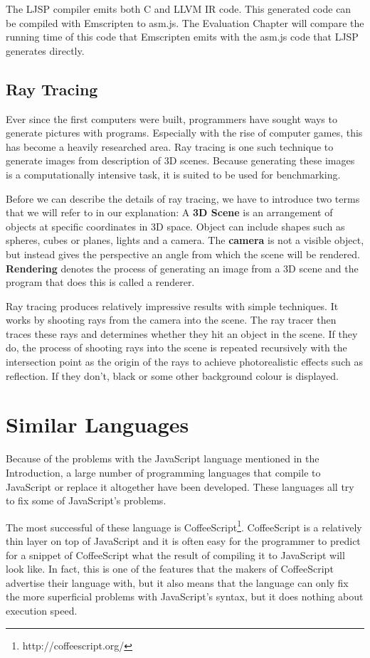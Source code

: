 \documentclass[11pt]{report}
\begin{document}
The LJSP compiler emits both C and LLVM IR code. This generated code can be compiled with Emscripten to asm.js. The Evaluation Chapter will compare the running time of this code that Emscripten emits with the asm.js code that LJSP generates directly.

\subsection{Ray Tracing}
Ever since the first computers were built, programmers have sought ways to generate pictures with programs. Especially with the rise of computer games, this has become a heavily researched area. Ray tracing is one such technique to generate images from description of 3D scenes. Because generating these images is a computationally intensive task, it is suited to be used for benchmarking.

Before we can describe the details of ray tracing, we have to introduce two terms that we will refer to in our explanation: A \textbf{3D Scene} is an arrangement of objects at specific coordinates in 3D space. Object can include shapes such as spheres, cubes or planes, lights and a camera. The \textbf{camera} is not a visible object, but instead gives the perspective an angle from which the scene will be rendered. \textbf{Rendering} denotes the process of generating an image from a 3D scene and the program that does this is called a renderer.

Ray tracing produces relatively impressive results with simple techniques. It works by shooting rays from the camera into the scene. The ray tracer then traces these rays and determines whether they hit an object in the scene. If they do, the process of shooting rays into the scene is repeated recursively with the intersection point as the origin of the rays to achieve photorealistic effects such as reflection. If they don't, black or some other background colour is displayed.

\section{Similar Languages}
Because of the problems with the JavaScript language mentioned in the Introduction, a large number of programming languages that compile to JavaScript or replace it altogether have been developed. These languages all try to fix some of JavaScript's problems.

The most successful of these language is CoffeeScript\footnote{http://coffeescript.org/}. CoffeeScript is a relatively thin layer on top of JavaScript and it is often easy for the programmer to predict for a snippet of CoffeeScript what the result of compiling it to JavaScript will look like. In fact, this is one of the features that the makers of CoffeeScript advertise their language with, but it also means that the language can only fix the more superficial problems with JavaScript's syntax, but it does nothing about execution speed.
\end{document}
